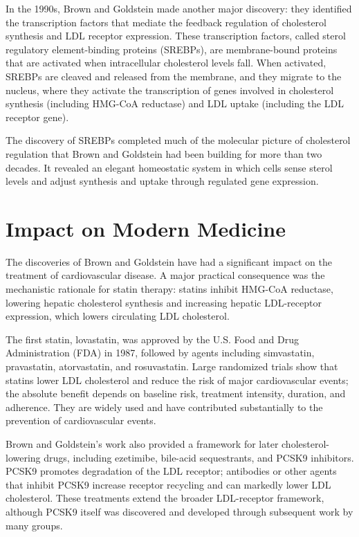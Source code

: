 In the 1990s, Brown and Goldstein made another major discovery: they identified the transcription factors that mediate the feedback regulation of cholesterol synthesis and LDL receptor expression. These transcription factors, called sterol regulatory element-binding proteins (SREBPs), are membrane-bound proteins that are activated when intracellular cholesterol levels fall. When activated, SREBPs are cleaved and released from the membrane, and they migrate to the nucleus, where they activate the transcription of genes involved in cholesterol synthesis (including HMG-CoA reductase) and LDL uptake (including the LDL receptor gene).

The discovery of SREBPs completed much of the molecular picture of cholesterol regulation that Brown and Goldstein had been building for more than two decades. It revealed an elegant homeostatic system in which cells sense sterol levels and adjust synthesis and uptake through regulated gene expression.

\section{Impact on Modern Medicine}

The discoveries of Brown and Goldstein have had a significant impact on the treatment of cardiovascular disease. A major practical consequence was the mechanistic rationale for statin therapy: statins inhibit HMG-CoA reductase, lowering hepatic cholesterol synthesis and increasing hepatic LDL-receptor expression, which lowers circulating LDL cholesterol.

The first statin, lovastatin, was approved by the U.S. Food and Drug Administration (FDA) in 1987, followed by agents including simvastatin, pravastatin, atorvastatin, and rosuvastatin. Large randomized trials show that statins lower LDL cholesterol and reduce the risk of major cardiovascular events; the absolute benefit depends on baseline risk, treatment intensity, duration, and adherence. They are widely used and have contributed substantially to the prevention of cardiovascular events.

Brown and Goldstein's work also provided a framework for later cholesterol-lowering drugs, including ezetimibe, bile-acid sequestrants, and PCSK9 inhibitors. PCSK9 promotes degradation of the LDL receptor; antibodies or other agents that inhibit PCSK9 increase receptor recycling and can markedly lower LDL cholesterol. These treatments extend the broader LDL-receptor framework, although PCSK9 itself was discovered and developed through subsequent work by many groups.

